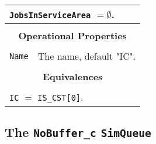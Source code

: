 \documentclass[12pt]{book}
\begin{document}
\begin{tabular}{|l|l|l|l|}
\multicolumn{4}{|l|}{\lstinline|JobsInServiceArea| $= \emptyset$.} \\
\hline
\multicolumn{4}{|c|}{} \\
\multicolumn{4}{|c|}{\bf Operational Properties} \\
\multicolumn{4}{|c|}{} \\
\hline
\lstinline|Name| & \multicolumn{3}{|l|}{The name, default "IC".} \\
\hline
\multicolumn{4}{|c|}{} \\
\multicolumn{4}{|c|}{\bf Equivalences} \\
\multicolumn{4}{|c|}{} \\
\hline
\multicolumn{4}{|l|}{\lstinline|IC| $=$ \lstinline|IS_CST[0]|.} \\
\hline
\end{tabular}

\subsection{The \lstinline{NoBuffer_c} \lstinline{SimQueue}}
\end{document}
